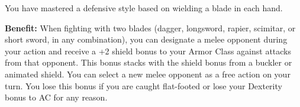 
You have mastered a defensive style based on wielding a blade in each hand.

\textbf{Benefit:} When fighting with two blades (dagger, longsword, rapier, scimitar, or short sword, in any combination), you can designate a melee opponent during your action and receive a +2 shield bonus to your Armor Class against attacks from that opponent. This bonus stacks with the shield bonus from a buckler or animated shield. You can select a new melee opponent as a free action on your turn. You lose this bonus if you are caught flat-footed or lose your Dexterity bonus to AC for any reason.